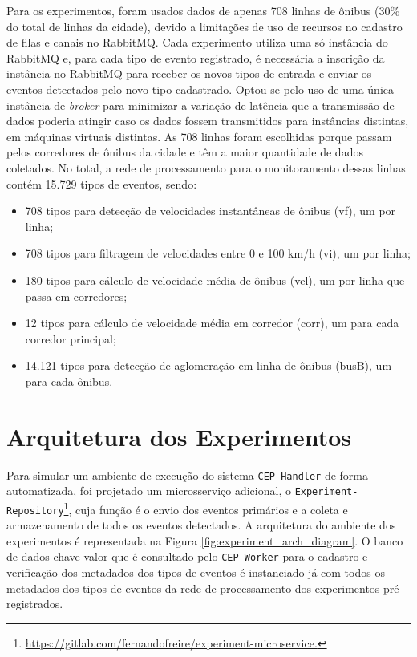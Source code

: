 Para os experimentos, foram usados dados de apenas 708 linhas de ônibus (30\% do total de linhas da cidade), devido a limitações de uso de recursos no cadastro de filas e canais no RabbitMQ. Cada experimento utiliza uma só instância do RabbitMQ e, para cada tipo de evento registrado, é necessária a inscrição da instância no RabbitMQ para receber os novos tipos de entrada e enviar os eventos detectados pelo novo tipo cadastrado. Optou-se pelo uso de uma única instância de \textit{broker} para minimizar a variação de latência que a transmissão de dados poderia atingir caso os dados fossem transmitidos para instâncias distintas, em máquinas virtuais distintas. As 708 linhas foram escolhidas porque passam pelos corredores de ônibus da cidade e têm a maior quantidade de dados coletados. No total, a rede de processamento para o monitoramento dessas linhas contém 15.729 tipos de eventos, sendo:
\begin{itemize}
    \item 708 tipos para detecção de velocidades instantâneas de ônibus (vf), um por linha;
    \item 708 tipos para filtragem de velocidades entre 0 e 100 km/h (vi), um por linha;
    \item 180 tipos para cálculo de velocidade média de ônibus (vel), um por linha que passa em corredores;
    \item 12 tipos para cálculo de velocidade média em corredor (corr), um para cada corredor principal;
    \item 14.121 tipos para detecção de aglomeração em linha de ônibus (busB), um para cada ônibus.
\end{itemize}


\section{Arquitetura dos Experimentos}
\label{sec:experiment_architecture}
Para simular um ambiente de execução do sistema \texttt{CEP Handler} de forma automatizada, foi projetado um microsserviço adicional, o \texttt{Experiment-Repository}\footnote{\url{https://gitlab.com/fernandofreire/experiment-microservice.}}, cuja função é o envio dos eventos primários e a coleta e armazenamento de todos os eventos detectados. A arquitetura do ambiente dos experimentos é representada na Figura \ref{fig:experiment_arch_diagram}.
O banco de dados chave-valor que é consultado pelo \texttt{CEP Worker} para o cadastro e verificação dos metadados dos tipos de eventos é instanciado já com todos os metadados dos tipos de eventos da rede de processamento dos experimentos pré-registrados.

